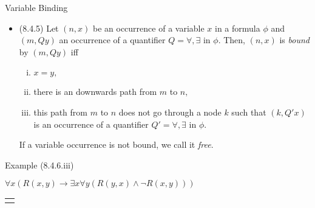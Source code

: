 \begin{frame}{Variable Binding}

\begin{itemize}%
\itemsep=16pt

	\item (8.4.5) Let $( n, x)$ be an occurrence of a variable $x$ in a formula $\phi$ and $( m, Qy)$ an occurrence of a quantifier $Q=\forall,\exists$ in $\phi$. Then, $( n, x)$ is {\it bound} by  $( m, Qy)$ iff
\begin{enumerate}[(i)]
\item $x=y,$
\item there is an downwards path from $m$ to $n,$
\item this path from $m$ to $n$ does not go through a node $k$ such that $( k, Q'x)$ is an occurrence of a quantifier $Q'=\forall,\exists$ in $\phi$.

\end{enumerate}
If a variable occurrence is not bound, we call it \emph{free}.

\end{itemize}

\end{frame}

\begin{frame}{Example (8.4.6.iii)}


\begin{center}{\small
$\forall x(R(x,y)\to \exists x\forall y(R(y,x)\land \neg R(x,y)))$

\vspace{2ex}

\begin{tabular}{c}
\begin{tikzpicture}[level distance = 2em]
{\Tree [.{\color{red}$\forall x$}
		[.$\to$ 
			[.{$R$} [.{\color{red}$x$} ] [.{\color{purple}$y$} ] ]
			[.{\color{green}$\exists x$ }
				[.{\color{blue}$\forall y$} 
					[.$\land$ 
						[.$R$
							[.{\color{blue}$y$} ]
							[.{\color{green}$x$} ]
						]	
						[.$\neg$ 
							[.{$R$}
								[.{\color{green}$x$} ]
								[.{\color{blue}$y$} ]
							]
						]
					]
				]
			]
		]
	]
}
\end{tikzpicture}
\end{tabular}}
\end{center}

\end{frame}


